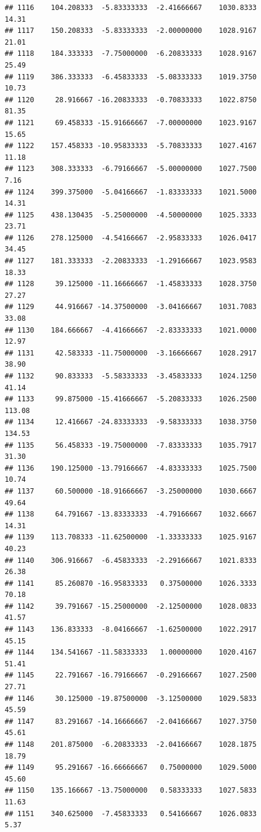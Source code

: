 \documentclass[
]{article}
\begin{document}
\begin{verbatim}
## 1116    104.208333  -5.83333333  -2.41666667    1030.8333       14.31
## 1117    150.208333  -5.83333333  -2.00000000    1028.9167       21.01
## 1118    184.333333  -7.75000000  -6.20833333    1028.9167       25.49
## 1119    386.333333  -6.45833333  -5.08333333    1019.3750       10.73
## 1120     28.916667 -16.20833333  -0.70833333    1022.8750       81.35
## 1121     69.458333 -15.91666667  -7.00000000    1023.9167       15.65
## 1122    157.458333 -10.95833333  -5.70833333    1027.4167       11.18
## 1123    308.333333  -6.79166667  -5.00000000    1027.7500        7.16
## 1124    399.375000  -5.04166667  -1.83333333    1021.5000       14.31
## 1125    438.130435  -5.25000000  -4.50000000    1025.3333       23.71
## 1126    278.125000  -4.54166667  -2.95833333    1026.0417       34.45
## 1127    181.333333  -2.20833333  -1.29166667    1023.9583       18.33
## 1128     39.125000 -11.16666667  -1.45833333    1028.3750       27.27
## 1129     44.916667 -14.37500000  -3.04166667    1031.7083       33.08
## 1130    184.666667  -4.41666667  -2.83333333    1021.0000       12.97
## 1131     42.583333 -11.75000000  -3.16666667    1028.2917       38.90
## 1132     90.833333  -5.58333333  -3.45833333    1024.1250       41.14
## 1133     99.875000 -15.41666667  -5.20833333    1026.2500      113.08
## 1134     12.416667 -24.83333333  -9.58333333    1038.3750      134.53
## 1135     56.458333 -19.75000000  -7.83333333    1035.7917       31.30
## 1136    190.125000 -13.79166667  -4.83333333    1025.7500       10.74
## 1137     60.500000 -18.91666667  -3.25000000    1030.6667       49.64
## 1138     64.791667 -13.83333333  -4.79166667    1032.6667       14.31
## 1139    113.708333 -11.62500000  -1.33333333    1025.9167       40.23
## 1140    306.916667  -6.45833333  -2.29166667    1021.8333       26.38
## 1141     85.260870 -16.95833333   0.37500000    1026.3333       70.18
## 1142     39.791667 -15.25000000  -2.12500000    1028.0833       41.57
## 1143    136.833333  -8.04166667  -1.62500000    1022.2917       45.15
## 1144    134.541667 -11.58333333   1.00000000    1020.4167       51.41
## 1145     22.791667 -16.79166667  -0.29166667    1027.2500       27.71
## 1146     30.125000 -19.87500000  -3.12500000    1029.5833       45.59
## 1147     83.291667 -14.16666667  -2.04166667    1027.3750       45.61
## 1148    201.875000  -6.20833333  -2.04166667    1028.1875       18.79
## 1149     95.291667 -16.66666667   0.75000000    1029.5000       45.60
## 1150    135.166667 -13.75000000   0.58333333    1027.5833       11.63
## 1151    340.625000  -7.45833333   0.54166667    1026.0833        5.37

\end{verbatim}
\end{document}
